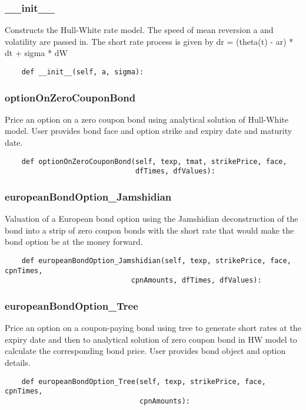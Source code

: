 \documentclass[twoside,11pt]{book}
\begin{document}
\subsubsection*{{\bf \_\_init\_\_}}
Constructs the Hull-White rate model. The speed of mean reversion a and volatility are passed in. The short rate process is given by dr = (theta(t) - ar) * dt  + sigma * dW  

\begin{lstlisting}
    def __init__(self, a, sigma):
\end{lstlisting}

\subsubsection*{{\bf optionOnZeroCouponBond}}
Price an option on a zero coupon bond using analytical solution of Hull-White model. User provides bond face and option strike and expiry date and maturity date.  

\begin{lstlisting}
    def optionOnZeroCouponBond(self, texp, tmat, strikePrice, face,
                               dfTimes, dfValues):
\end{lstlisting}

\subsubsection*{{\bf europeanBondOption\_Jamshidian}}
Valuation of a European bond option using the Jamshidian deconstruction of the bond into a strip of zero coupon bonds with the short rate that would make the bond option be at the money forward.  

\begin{lstlisting}
    def europeanBondOption_Jamshidian(self, texp, strikePrice, face, cpnTimes,
                              cpnAmounts, dfTimes, dfValues):
\end{lstlisting}

\subsubsection*{{\bf europeanBondOption\_Tree}}
Price an option on a coupon-paying bond using tree to generate short rates at the expiry date and then to analytical solution of zero coupon bond in HW model to calculate the corresponding bond price. User provides bond object and option details.  

\begin{lstlisting}
    def europeanBondOption_Tree(self, texp, strikePrice, face, cpnTimes,
                                cpnAmounts):
\end{lstlisting}
\end{document}
